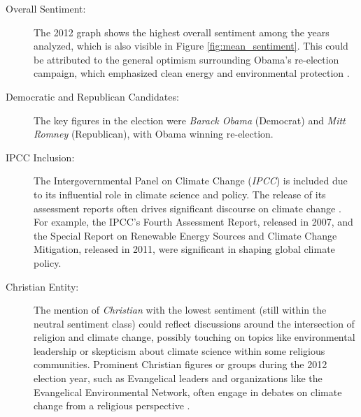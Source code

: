 \begin{description}
    \item[Overall Sentiment:] The 2012 graph shows the highest overall sentiment among the years analyzed, which is also visible in Figure \ref{fig:mean_sentiment}. This could be attributed to the general optimism surrounding Obama's re-election campaign, which emphasized clean energy and environmental protection \cite{obama2013climate}.
    \item[Democratic and Republican Candidates:] The key figures in the election were \emph{Barack Obama} (Democrat) and \emph{Mitt Romney} (Republican), with Obama winning re-election.
    \item[IPCC Inclusion:] The Intergovernmental Panel on Climate Change (\emph{IPCC}) is included due to its influential role in climate science and policy. The release of its assessment reports often drives significant discourse on climate change \cite{IPCC2014}. For example, the IPCC's Fourth Assessment Report, released in 2007, and the Special Report on Renewable Energy Sources and Climate Change Mitigation, released in 2011, were significant in shaping global climate policy.
    \item[Christian Entity:] The mention of \emph{Christian} with the lowest sentiment (still within the neutral sentiment class) could reflect discussions around the intersection of religion and climate change, possibly touching on topics like environmental leadership or skepticism about climate science within some religious communities. Prominent Christian figures or groups during the 2012 election year, such as Evangelical leaders and organizations like the Evangelical Environmental Network, often engage in debates on climate change from a religious perspective \cite{Veldman2019}.
\end{description}


